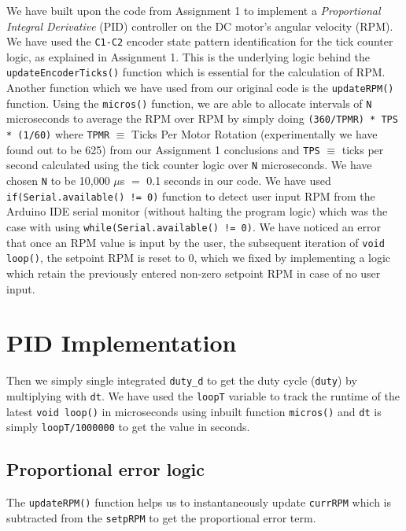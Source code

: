 \documentclass[12pt]{article}
\begin{document}
We have built upon the code from Assignment 1 to implement a \textit{Proportional Integral Derivative} (PID) controller on the DC motor's angular velocity (RPM). We have used the \texttt{C1-C2} encoder state pattern identification for the tick counter logic, as explained in Assignment 1. This is the underlying logic behind the \texttt{updateEncoderTicks()} function which is essential for the calculation of RPM. Another function which we have used from our original code is the \texttt{updateRPM()} function. Using the \texttt{micros()} function, we are able to allocate intervals of \texttt{N} microseconds to average the RPM over RPM by simply doing \texttt{(360/TPMR) * TPS * (1/60)} where \texttt{TPMR} \(\equiv\) Ticks Per Motor Rotation (experimentally we have found out to be 625) from our Assignment 1 conclusions and \texttt{TPS} \(\equiv\) ticks per second calculated using the tick counter logic over \texttt{N} microseconds. We have chosen \texttt{N} to be 10,000 \(\mu\)s \(=\) 0.1 seconds in our code. We have used \texttt{if(Serial.available() != 0)} function to detect user input RPM from the Arduino IDE serial monitor (without halting the program logic) which was the case with using \texttt{while(Serial.available() != 0)}. We have noticed an error that once an RPM value is input by the user, the subsequent iteration of \texttt{void loop()}, the setpoint RPM is reset to 0, which we fixed by implementing a logic which retain the previously entered non-zero setpoint RPM in case of no user input.

\section{PID Implementation}

Then we simply single integrated \texttt{duty\_d} to get the duty cycle (\texttt{duty}) by multiplying with \texttt{dt}. We have used the \texttt{loopT} variable to track the runtime of the latest \texttt{void loop()} in microseconds using inbuilt function \texttt{micros()} and \texttt{dt} is simply \texttt{loopT/1000000} to get the value in seconds.

\subsection*{Proportional error logic}
The \texttt{updateRPM()} function helps us to instantaneously update \texttt{currRPM} which is subtracted from the \texttt{setpRPM} to get the proportional error term.
\end{document}
